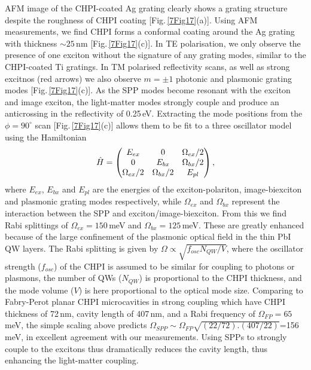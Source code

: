 AFM image of the CHPI-coated Ag grating clearly shows a grating structure despite the roughness of CHPI coating [Fig.\,\ref{7Fig17}(a)]. Using AFM measurements, we find CHPI forms a conformal coating around the Ag grating with thickness $\sim25$\,nm [Fig.\,\ref{7Fig17}(c)]. In TE polarisation, we only observe the presence of one exciton without the signature of any grating modes, similar to the CHPI-coated Ti gratings. In TM polarised reflectivity scans, as well as strong excitnos (red arrows) we also observe $m=\pm1$ photonic and plasmonic grating modes [Fig.\,\ref{7Fig17}(c)].  As the SPP modes become resonant with the exciton and image exciton, the light-matter modes strongly couple and produce an anticrossing in the reflectivity of 0.25\,eV. Extracting the mode positions from the $\phi=90^{\circ}$ scan [Fig.\,\ref{7Fig17}(c)] allows them to be fit to a three oscillator model using the Hamiltonian
\begin{equation}
\centering 
\hat{H}=\left( \begin{matrix} 
E_{ex} & 0 & \Omega_{ex}/2 \\
0 & E_{bx} & \Omega_{bx}/2 \\
\Omega_{ex}/2 & \Omega_{bx}/2 & E_{pl} 
\end{matrix} \right) ,
\end{equation}
where $E_{ex}$, $E_{bx}$ and $E_{pl}$ are the energies of the exciton-polariton, image-biexciton and plasmonic grating modes respectively, while $\Omega_{ex}$ and $\Omega_{bx}$ represent the interaction between the SPP and exciton/image-biexciton. From this we find Rabi splittings of $\Omega_{ex}=150$\,meV and $\Omega_{bx}=125$\,meV. 
These are greatly enhanced because of the large confinement of the plasmonic optical field in the thin PbI QW layers. The Rabi splitting is given by $\Omega \propto \sqrt{f_{osc} N_{QW}/V}$, where the oscillator strength ($f_{osc}$) of the CHPI is assumed to be similar for coupling to photons or plasmons, the number of QWs ($N_{QW}$) is proportional to the CHPI thickness, and the mode volume ($V$) is here proportional to the optical mode size. Comparing to Fabry-Perot planar CHPI microcavities in strong coupling \cite{Pradeesh2009b} which have CHPI thickness of 72\,nm, cavity length of 407\,nm, and a Rabi frequency of $\Omega_{FP}=65$\,meV, the simple scaling above predicts $\Omega_{SPP} \sim \Omega_{FP} \sqrt{(22/72).(407/22)}$=156\,meV, in excellent agreement with our measurements. Using SPPs to strongly couple to the excitons thus dramatically reduces the cavity length, thus enhancing the light-matter coupling.

